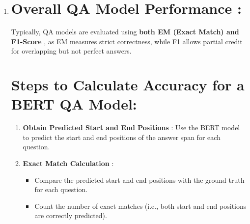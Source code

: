 \documentclass[10pt]{article}
\begin{document}
\begin{enumerate}
      To calculate the F1-Score for a predicted answer:

      $$
      \text{Precision} = \frac{\text{Number of Correctly Predicted Tokens}}{\text{Total Number of Predicted Tokens}}
      $$
      $$
      \text{Recall} = \frac{\text{Number of Correctly Predicted Tokens}}{\text{Total Number of True Answer Tokens}}
      $$
      $$
      \text{F1-Score} = 2 \times \frac{\text{Precision} \times \text{Recall}}{\text{Precision} + \text{Recall}}
      $$

      { \bf Example }:

      - Let’s say the true answer is "deep learning is powerful" and the model predicts "learning is powerful".

      - { \bf Precision }: 3 correct tokens ("learning", "is", "powerful") out of 3 predicted tokens = 100%

      - { \bf Recall }: 3 correct tokens out of 4 total true answer tokens = 75%

      - { \bf F1-Score } = $( 2 \times \frac{1.0 \times 0.75}{1.0 + 0.75} = 0.86 )$ or 86%

   \item
      \section*{{ \bf Overall QA Model Performance }:}
      Typically, QA models are evaluated using { \bf both EM (Exact Match){ \bf  and  }F1-Score }, as EM measures strict correctness, while F1 allows partial credit for overlapping but not perfect answers.

      \section*{ Steps to Calculate Accuracy for a BERT QA Model:}
      \begin{enumerate}
         \item { \bf Obtain Predicted Start and End Positions }: Use the BERT model to predict the start and end positions of the answer span for each question.
         \item { \bf Exact Match Calculation }:
         \begin{itemize}
            \item [-] Compare the predicted start and end positions with the ground truth for each question.
            \item [-] Count the number of exact matches (i.e., both start and end positions are correctly predicted).
         \end{itemize}


\end{enumerate}
\end{enumerate}
\end{document}
